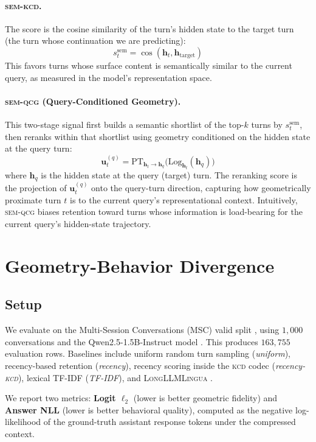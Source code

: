 \documentclass[11pt]{article}
\newcommand{\kcd}{\textsc{kcd}}
\newcommand{\semqcg}{\textsc{sem-qcg}}
\newcommand{\semkcd}{\textsc{sem-kcd}}
\newcommand{\hv}{\mathbf{h}}
\newcommand{\uv}{\mathbf{u}}
\newcommand{\PT}{\mathrm{PT}}
\newcommand{\Log}{\mathrm{Log}}
\begin{document}
\paragraph{\semkcd{}.}
The score is the cosine similarity of the turn's hidden state to the
target turn (the turn whose continuation we are predicting):
\[
s_t^{\text{sem}} = \cos(\hv_t, \hv_{\text{target}})
\]
This favors turns whose surface content is semantically similar to
the current query, as measured in the model's representation space.

\paragraph{\semqcg{} (Query-Conditioned Geometry).}
This two-stage signal first builds a semantic shortlist of the top-$k$
turns by $s_t^{\text{sem}}$, then reranks within that shortlist using
geometry conditioned on the hidden state at the query turn:
\[
\uv_t^{(q)} = \PT_{\hv_t \to \hv_q}\bigl(\Log_{\hv_t}(\hv_q)\bigr)
\]
where $\hv_q$ is the hidden state at the query (target) turn.
The reranking score is the projection of $\uv_t^{(q)}$ onto the
query-turn direction, capturing how geometrically proximate turn $t$
is to the current query's representational context.
Intuitively, \semqcg{} biases retention toward turns whose information
is load-bearing for the current query's hidden-state trajectory.

\section{Geometry-Behavior Divergence}
\label{sec:divergence}

\subsection{Setup}
We evaluate on the Multi-Session Conversations (MSC) valid split
\citep{xu-etal-2022-beyond},
using $1{,}000$ conversations and the Qwen2.5-1.5B-Instruct model
\citep{qwen2025qwen25technicalreport}.
This produces $163{,}755$ evaluation rows.
Baselines include uniform random turn sampling (\emph{uniform}),
recency-based retention (\emph{recency}),
recency scoring inside the \kcd{} codec (\emph{recency-\kcd{}}),
lexical TF-IDF (\emph{TF-IDF}),
and \textsc{LongLLMLingua} \citep{jiang-etal-2024-longllmlingua}.

We report two metrics:
\textbf{Logit $\ell_2$} (lower is better geometric fidelity) and
\textbf{Answer NLL} (lower is better behavioral quality), computed as
the negative log-likelihood of the ground-truth assistant response tokens
under the compressed context.
\end{document}
